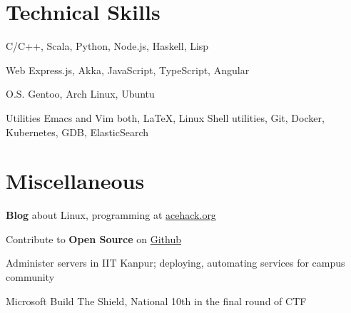 \documentclass{tccv}
\begin{document}
\vspace{-0.4cm}
\section{Technical Skills}

C/C++, Scala, Python, Node.js, Haskell, Lisp

\vspace{0.2cm}
\begin{factlist}

\item{\small{Web}}
  {Express.js, Akka, JavaScript, TypeScript, Angular}

  \vspace{-0.2cm}
\item{\small{O.S.}}
  {Gentoo, Arch Linux, Ubuntu}

  \vspace{-0.2cm}
\item {\small{Utilities}}
  {Emacs and Vim both, \LaTeX, Linux Shell utilities, Git, Docker,
    Kubernetes, GDB, ElasticSearch}

\end{factlist}

\vspace{-0.6cm}
\section{Miscellaneous}
\vspace{0.2cm}
\begin{thinitemize}
\item \textbf{Blog} about Linux, programming at \href{http://acehack.org}{acehack.org}
\item Contribute to \textbf{Open Source}
  on \href{https://github.com/sakshamsharma}{Github}
\item Administer servers in IIT Kanpur; deploying,
  automating services for campus community
\item Microsoft Build The Shield, National 10th in the final round of CTF
\end{thinitemize}
\end{document}
